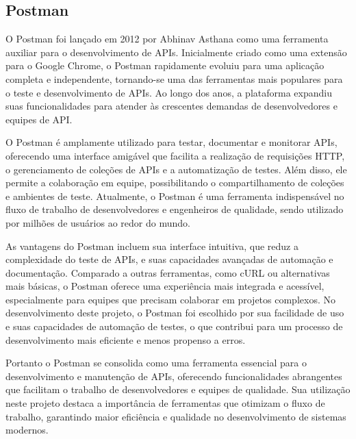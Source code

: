 \subsection{Postman}

O Postman foi lançado em 2012 por Abhinav Asthana como uma ferramenta auxiliar para o desenvolvimento de APIs. Inicialmente criado como uma extensão para o Google Chrome, o Postman rapidamente evoluiu para uma aplicação completa e independente, tornando-se uma das ferramentas mais populares para o teste e desenvolvimento de APIs. Ao longo dos anos, a plataforma expandiu suas funcionalidades para atender às crescentes demandas de desenvolvedores e equipes de API.

O Postman é amplamente utilizado para testar, documentar e monitorar APIs, oferecendo uma interface amigável que facilita a realização de requisições HTTP, o gerenciamento de coleções de APIs e a automatização de testes. Além disso, ele permite a colaboração em equipe, possibilitando o compartilhamento de coleções e ambientes de teste. Atualmente, o Postman é uma ferramenta indispensável no fluxo de trabalho de desenvolvedores e engenheiros de qualidade, sendo utilizado por milhões de usuários ao redor do mundo.

As vantagens do Postman incluem sua interface intuitiva, que reduz a complexidade do teste de APIs, e suas capacidades avançadas de automação e documentação. Comparado a outras ferramentas, como cURL ou alternativas mais básicas, o Postman oferece uma experiência mais integrada e acessível, especialmente para equipes que precisam colaborar em projetos complexos. No desenvolvimento deste projeto, o Postman foi escolhido por sua facilidade de uso e suas capacidades de automação de testes, o que contribui para um processo de desenvolvimento mais eficiente e menos propenso a erros.

Portanto o Postman se consolida como uma ferramenta essencial para o desenvolvimento e manutenção de APIs, oferecendo funcionalidades abrangentes que facilitam o trabalho de desenvolvedores e equipes de qualidade. Sua utilização neste projeto destaca a importância de ferramentas que otimizam o fluxo de trabalho, garantindo maior eficiência e qualidade no desenvolvimento de sistemas modernos.